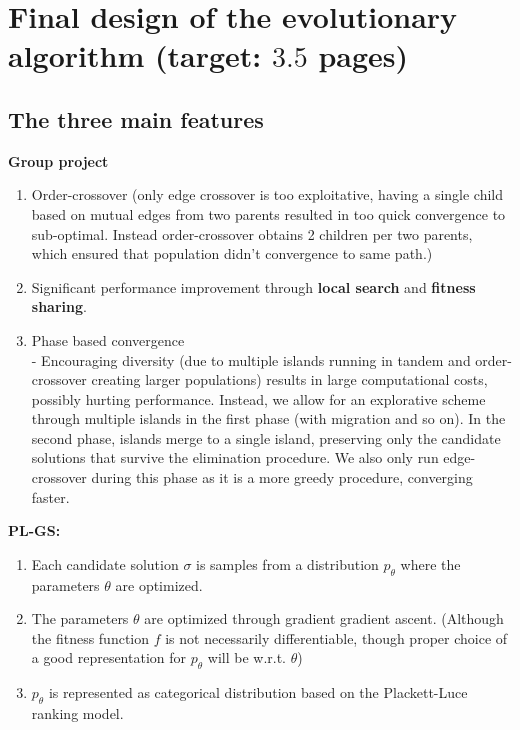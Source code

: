 \documentclass[a4paper,10pt]{article}
\def\retake{0}
\newcommand{\switch}[2]{\ifnum\retake=0{#1}\else{#2}\fi}
\newcommand{\ReplaceMe}[1]{{\color{blue}#1}}
\newcommand{\RemoveMe}[1]{{\color{purple}#1}}
\begin{document}
\section{Final design of the evolutionary algorithm (target: $3.5$ pages)} 


\subsection{The three main features}


\textbf{Group project}
	\begin{enumerate}
	\item Order-crossover (only edge crossover is too exploitative, having a single child based on mutual edges from two parents resulted in too quick convergence to sub-optimal. Instead order-crossover obtains 2 children per two parents, which ensured that population didn't convergence to same path.)
	\item Significant performance improvement through \textbf{local search} and \textbf{fitness sharing}.
	\item Phase based convergence \\
		- Encouraging diversity (due to multiple islands running in tandem and order-crossover creating larger populations) results in large computational costs, possibly hurting performance. Instead, we allow for an explorative scheme through multiple islands in the first phase (with migration and so on). In the second phase, islands merge to a single island, preserving only the candidate solutions that survive the elimination procedure. We also only run edge-crossover during this phase as it is a more greedy procedure, converging faster.
	\end{enumerate}


\textbf{PL-GS:}
	\begin{enumerate}
	 \item Each candidate solution $\sigma$ is samples from a distribution $p_\theta$ where the parameters $\theta$ are optimized.
	 \item The parameters $\theta$ are optimized through gradient gradient ascent. (Although the fitness function $f$ is not necessarily differentiable, though proper choice of a good representation for $p_\theta$ will be w.r.t. $\theta$)
	 \item $p_\theta$ is represented as categorical distribution based on the Plackett-Luce ranking model.
	\end{enumerate}
\end{document}
